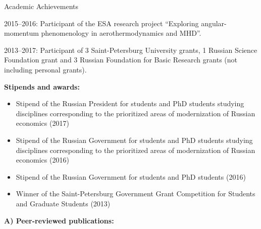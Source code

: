 \documentclass{resume} %
\begin{document}
\begin{rSection}{Academic Achievements}
\begin{enumerate}
\end{enumerate}


2015--2016: Participant of the ESA research project ``Exploring angular-momentum phenomenology in aerothermodynamics and MHD''.

2013--2017: Participant of 3 Saint-Petersburg University grants, 1 Russian Science Foundation grant and 3 Russian Foundation for Basic Research grants (not including personal grants).

{\bf Stipends and awards:}
\begin{itemize}
    \item Stipend of the Russian President for students and PhD students studying disciplines corresponding to the prioritized areas of modernization of Russian economics (2017)
    \item Stipend of the Russian Government for students and PhD students studying disciplines corresponding to the prioritized areas of modernization of Russian economics (2016)
    \item Stipend of the Russian Government for students and PhD students (2016)
    \item Winner of the Saint-Petersburg Government Grant Competition for Students and Graduate Students (2013)
\end{itemize}
\end{rSection}

\newpage



{\bf A) Peer-reviewed publications:}
\end{document}
